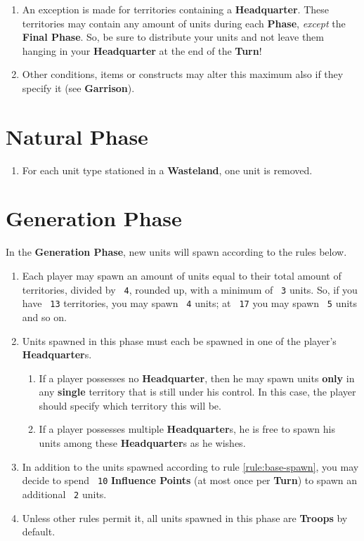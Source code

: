 \documentclass[10pt,openright,a4paper,openany]{article}
\newcommand{\num}[1]{\texttt{\color{purple} {#1}}}
\newcommand{\term}[1]{\textbf{\color{purple} #1}}
\newcommand{\headquarter}{\term{Headquarter}}
\begin{document}
\begin{enumerate}
	\begin{enumerate}
		\item An exception is made for territories containing a \headquarter{}. These territories may contain any amount of units during each \term{Phase}, \emph{except} the \term{Final Phase}. So, be sure to distribute your units and not leave them hanging in your \headquarter{} at the end of the \term{Turn}!
		\item Other conditions, items or constructs may alter this maximum also if they specify it (see \term{Garrison}).
	\end{enumerate}
\end{enumerate}

\section{Natural Phase}\label{sec:natural}
\begin{enumerate}
	\item For each unit type stationed in a \term{Wasteland}, one unit is removed.
\end{enumerate}

\section{Generation Phase}\label{sec:generation}
In the \term{Generation Phase}, new units will spawn according to the rules below.
\begin{enumerate}
	\item \label{rule:base-spawn}Each player may spawn an amount of units equal to their total amount of territories, divided by \num{4}, rounded up, with a minimum of \num{3} units. So, if you have \num{13} territories, you may spawn \num{4} units; at \num{17} you may spawn \num{5} units and so on.
	\item Units spawned in this phase must each be spawned in one of the player's \headquarter{}{}s.
	\begin{enumerate}
		\item If a player possesses no \headquarter{}, then he may spawn units \textbf{only} in any \textbf{single} territory that is still under his control. In this case, the player should specify which territory this will be.
		\item If a player possesses multiple \headquarter{}{}s, he is free to spawn his units among these \headquarter{}{}s as he wishes.
	\end{enumerate}

	\item In addition to the units spawned according to rule \ref{rule:base-spawn}, you may decide to spend \num{10} \term{Influence Points} (at most once per \term{Turn}) to spawn an additional \num{2} units.
	\item Unless other rules permit it, all units spawned in this phase are \term{Troops} by default.
\end{enumerate}
\end{document}
